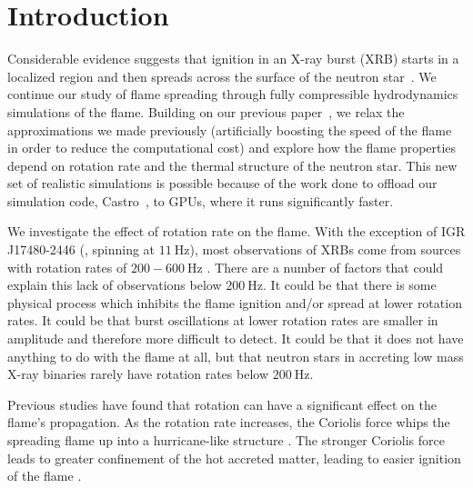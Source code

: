 \documentclass[preprint,times,tighten]{aastex63}
\newcommand{\castro}{{\sf Castro}}
\begin{document}

\section{Introduction}\label{Sec:Introduction}

Considerable evidence suggests that ignition in an X-ray burst (XRB) starts
in a localized region and then spreads across the surface of the
neutron star~\citep{bhattacharyya:2007,chakraborty:2014}.  We continue
our study of flame spreading through fully compressible hydrodynamics
simulations of the flame.  Building on our previous
paper~\citep{flame_wave1}, we relax the approximations we made
previously (artificially boosting the speed of the flame in order to
reduce the computational cost) and explore how the flame properties
depend on rotation rate and the thermal structure of the neutron
star. This new set of realistic simulations is possible because of the
work done to offload our simulation code, \castro~\citep{castro_joss}, to GPUs, where it
runs significantly faster.


We investigate the effect of rotation rate on the flame. With the
exception of IGR J17480-2446 (\citealt{altamirano2010discovery}, spinning at $11~\mathrm{Hz}$), most observations of
XRBs come from sources with rotation rates of $200-600~\mathrm{Hz}$
\citep{bilous:2019,galloway:2020}. There are a number of
factors that could explain this lack of observations below $200~\mathrm{Hz}$. It
could be that there is some physical process which inhibits the flame
ignition and/or spread at lower rotation rates. It could be that burst
oscillations at lower rotation rates are smaller in amplitude and
therefore more difficult to detect. It could be that it does not have
anything to do with the flame at all, but that neutron stars in
accreting low mass X-ray binaries rarely have rotation rates below $200~\mathrm{Hz}$.
 
Previous studies have found that rotation can have a significant
effect on the flame's propagation. As the rotation rate increases, the
Coriolis force whips the spreading flame up into a hurricane-like
structure \citep{spitkovsky2002,cavecchi:2013}. The stronger Coriolis
force leads to greater confinement of the hot accreted matter, leading
to easier ignition of the flame \citep{art-2015-cavecchi-etal}.
\end{document}
